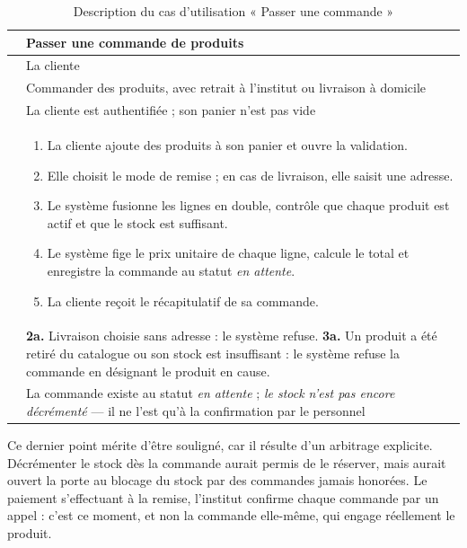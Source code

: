 \begin{table}[H]
\centering
\caption{Description du cas d'utilisation « Passer une commande »}
\label{tab:cu-commander}
\begin{tabularx}{\textwidth}{L{3.1cm} X}
\toprule
{} & Passer une commande de produits \\
\midrule
{} & La cliente \\
 & Commander des produits, avec retrait à l'institut ou
livraison à domicile \\
 & La cliente est authentifiée ; son panier n'est pas
vide \\
 &
\begin{enumerate}[leftmargin=*,nosep]
  \item La cliente ajoute des produits à son panier et ouvre la validation.
  \item Elle choisit le mode de remise ; en cas de livraison, elle saisit une
  adresse.
  \item Le système fusionne les lignes en double, contrôle que chaque produit
  est actif et que le stock est suffisant.
  \item Le système fige le prix unitaire de chaque ligne, calcule le total et
  enregistre la commande au statut \textit{en attente}.
  \item La cliente reçoit le récapitulatif de sa commande.
\end{enumerate} \\
 &
\textbf{2a.} Livraison choisie sans adresse : le système refuse.\newline
\textbf{3a.} Un produit a été retiré du catalogue ou son stock est
insuffisant : le système refuse la commande en désignant le produit en
cause. \\
 & La commande existe au statut \textit{en attente} ;
\emph{le stock n'est pas encore décrémenté} --- il ne l'est qu'à la
confirmation par le personnel \\
\bottomrule
\end{tabularx}
\end{table}

Ce dernier point mérite d'être souligné, car il résulte d'un arbitrage
explicite. Décrémenter le stock dès la commande aurait permis de le réserver,
mais aurait ouvert la porte au blocage du stock par des commandes jamais
honorées. Le paiement s'effectuant à la remise, l'institut confirme chaque
commande par un appel : c'est ce moment, et non la commande elle-même, qui
engage réellement le produit.

